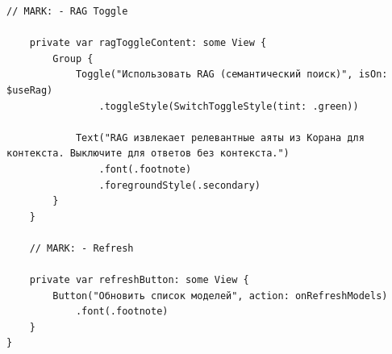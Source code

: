 \begin{lstlisting}[basicstyle=\tiny\ttfamily,breaklines=true]
    // MARK: - RAG Toggle

    private var ragToggleContent: some View {
        Group {
            Toggle("Использовать RAG (семантический поиск)", isOn: $useRag)
                .toggleStyle(SwitchToggleStyle(tint: .green))

            Text("RAG извлекает релевантные аяты из Корана для контекста. Выключите для ответов без контекста.")
                .font(.footnote)
                .foregroundStyle(.secondary)
        }
    }

    // MARK: - Refresh

    private var refreshButton: some View {
        Button("Обновить список моделей", action: onRefreshModels)
            .font(.footnote)
    }
}
\end{lstlisting}

